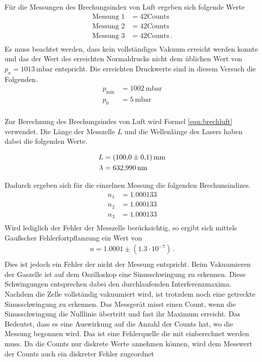 Für die Messungen des Brechungsindex von Luft ergeben sich folgende Werte
\begin{align*}
  \text{Messung 1} &= 42 \text{Counts} \\
  \text{Messung 2} &= 42 \text{Counts} \\
  \text{Messung 3} &= 42 \text{Counts} \, . \\
\end{align*}
Es muss beachtet werden, dass kein vollständiges Vakuum erreicht werden konnte
und das der Wert des erreichten Normaldrucks nicht dem üblichen Wert von
$p_a= \SI{1013}{\milli\bar}$ \cite{druck} entspricht. Die erreichten Druckwerte sind in
diesem Versuch die Folgenden.
\begin{align*}
  p_{\text{min}} &= \SI{1002}{\milli\bar} \\
  p_0            &= \SI{5}{\milli\bar} \\
\end{align*}

Zur Berechnung des Brechungsindes von Luft wird Formel \ref{eqn:brechluft}
verwendet. Die Länge der Messzelle $L$ und die Wellenlänge des Lasers
haben dabei die folgenden Werte.

\begin{align*}
  L &= \SI{100 \pm 0.1}{\milli\meter} \\
  \lambda &= \SI{632.990}{\nano\meter} \\
\end{align*}

Dadurch ergeben sich für die einzelnen Messung die folgenden Brechunsindizes.
\begin{align*}
  n_1 &= 1.000133 \\
  n_2 &= 1.000133 \\
  n_3 &= 1.000133 \\
\end{align*}
Wird lediglich der Fehler der Messzelle berücksichtig, so ergibt sich mittels
Gaußscher Fehlerfortpflanzung ein Wert von
\begin{align*}
  n = 1.0001 \pm (1.3 \cdot 10^{-7}) \, .\\
\end{align*}
Dies ist jedoch ein Fehler der nicht der Messung entspricht. Beim Vakuumieren
der Gaszelle ist auf dem Oszilloskop eine Sinusschwingung zu erkennen. Diese
Schwingungen entsprechen dabei den durchlaufenden Interferenzmaxima. Nachdem
die Zelle vollständig vakuumiert wird, ist trotzdem noch eine getreckte
Sinusschwingung zu erkennen. Das Messgerät misst einen Count, wenn die
Sinusschwingung die Nulllinie übertritt und fast ihr Maximum erreicht. Das
Bedeutet, dass es eine Auswirkung auf die Anzahl der Counts hat, wo die
Messung begonnen wird. Das ist eine Fehlerquelle die mit einberechnet werden
muss. Da die Counts nur diskrete Werte annehmen können, wird dem Messwert
der Counts auch ein diskreter Fehler zugeordnet

